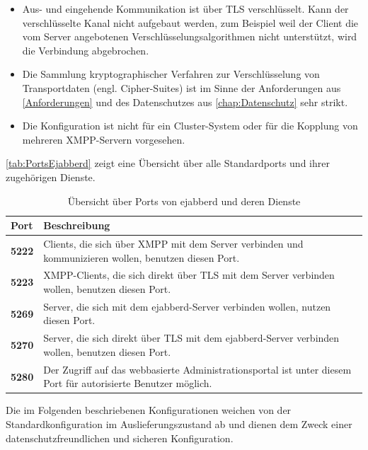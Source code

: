 \documentclass[a4paper,titlepage,halfparskip,12pt]{scrreprt}
\begin{document}
\begin{onehalfspacing}
\begin{itemize}
\item Aus- und eingehende Kommunikation ist über \ac{TLS} verschlüsselt. Kann der verschlüsselte Kanal nicht aufgebaut werden, zum Beispiel weil der Client die vom Server angebotenen Verschlüsselungsalgorithmen nicht unterstützt, wird die Verbindung abgebrochen.

\item Die Sammlung kryptographischer Verfahren zur Verschlüsselung von Transportdaten (engl. Cipher-Suites) ist im Sinne der Anforderungen aus \autoref{Anforderungen} und des Datenschutzes aus \autoref{chap:Datenschutz} sehr strikt.

\item Die Konfiguration ist nicht für ein Cluster-System oder für die Kopplung von mehreren \ac{XMPP}-Servern vorgesehen.

\end{itemize}

\autoref{tab:PortsEjabberd} zeigt eine Übersicht über alle Standardports und ihrer zugehörigen Dienste.

\begin{table}[h]
\centering
\caption{Übersicht über Ports von ejabberd und deren Dienste}
\begin{tabular}{|l|p{}|}
\hline
\textbf{Port} & \textbf{Beschreibung} \\
\hline
\textbf{5222} & Clients, die sich über \ac{XMPP} mit dem Server verbinden und kommunizieren wollen, benutzen diesen Port. \\
\hline
\textbf{5223} & \ac{XMPP}-Clients, die sich direkt über \ac{TLS} mit dem Server verbinden wollen, benutzen diesen Port. \\
\hline
\textbf{5269} & Server, die sich mit dem ejabberd-Server verbinden wollen, nutzen diesen Port. \\
\hline
\textbf{5270} & Server, die sich direkt über \ac{TLS} mit dem ejabberd-Server verbinden wollen, benutzen diesen Port.  \\
\hline
\textbf{5280} & Der Zugriff auf das webbasierte Administrationsportal ist unter diesem Port für autorisierte Benutzer möglich. \\
\hline
\end{tabular}
\label{tab:PortsEjabberd}
\end{table}

Die im Folgenden beschriebenen Konfigurationen weichen von der Standardkonfiguration im Auslieferungszustand ab und dienen dem Zweck einer datenschutzfreundlichen und sicheren Konfiguration.


\end{onehalfspacing}
\end{document}
